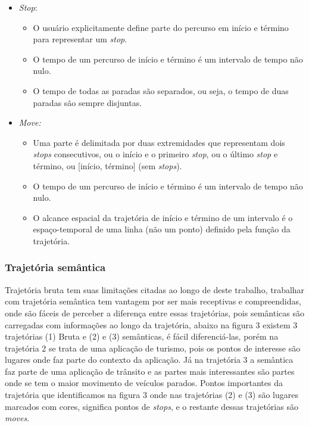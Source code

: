 \documentclass[	12pt, Times, openright, twoside, a4paper, english, brazil]{abntex2}
\begin{document}
\begin{itemize}
\item \textit{Stop}:
	\begin{itemize}
    \item O usuário explicitamente define parte do percurso em início e término para representar um \textit{stop}.
    \item O tempo de um percurso de início e término é um intervalo de tempo não nulo.
    \item O tempo de todas as paradas são separados, ou seja, o tempo de duas paradas são sempre disjuntas.
    \end{itemize}
\item \textit{Move:}
	\begin{itemize}
    \item Uma parte é delimitada por duas extremidades que representam dois \textit{stops} consecutivos, ou o início e o primeiro \textit{stop}, ou o último \textit{stop} e término, ou [início, término] (sem \textit{stops}).
    \item O tempo de um percurso de início e término é um intervalo de tempo não nulo.
    \item O alcance espacial da trajetória de início e término de um intervalo é o espaço-temporal de uma linha (não um ponto) definido pela função da trajetória.
    \end{itemize}
\end{itemize}

\subsubsection{Trajetória semântica}
Trajetória bruta tem suas limitações citadas ao longo de deste trabalho, trabalhar com trajetória semântica tem vantagem por ser mais receptivas e compreendidas, onde são fáceis de perceber a diferença entre essas trajetórias, pois semânticas são carregadas com informações ao longo da trajetória, abaixo na figura 3 existem 3 trajetórias (1) Bruta e (2) e (3) semânticas, é fácil diferenciá-las, porém na trajetória 2 se trata de uma aplicação de turismo, pois os pontos de interesse são lugares onde faz parte do contexto da aplicação. Já na trajetória 3 a semântica faz parte de uma aplicação de trânsito e as partes mais interessantes são partes onde se tem o maior movimento de veículos parados. Pontos importantes da trajetória que identificamos na figura 3 onde nas trajetórias (2) e (3) são lugares marcados com cores, significa pontos de \textit{stops}, e o restante dessas trajetórias são \textit{moves}.  
\end{document}
